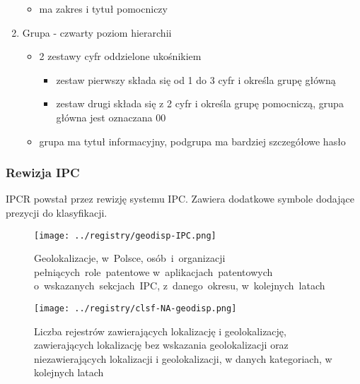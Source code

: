 \begin{enumerate}
\begin{itemize}
        \item ma zakres i tytuł pomocniczy
    \end{itemize}
    \item Grupa - czwarty poziom hierarchii
    \begin{itemize}
        \item 2 zestawy cyfr oddzielone ukośnikiem
        \begin{itemize}
            \item zestaw pierwszy składa się od 1 do 3 cyfr i określa grupę główną
            \item zestaw drugi składa się z 2 cyfr i określa grupę pomocniczą, grupa główna jest oznaczana 00
        \end{itemize}
        \item grupa ma tytuł informacyjny, podgrupa ma bardziej szczegółowe hasło
    \end{itemize}
\end{enumerate}



\subsubsection{Rewizja \ac{IPC}}

\ac{IPCR} powstał przez rewizję systemu \ac{IPC}. Zawiera dodatkowe
symbole dodające prezycji do klasyfikacji.

\begin{figure}[H]\centering
\texttt{[image: ../registry/geodisp-IPC.png]}
\caption{Geolokalizacje,
         w~Polsce,
         osób~i~organizacji 
         pełniących~role~patentowe 
         w~aplikacjach~patentowych
         o~wskazanych~sekcjach~IPC,
         z~danego~okresu,
         w~kolejnych~latach}
\label{fig:geodisp.png}
\end{figure}



\begin{figure}[H]\centering
\texttt{[image: ../registry/clsf-NA-geodisp.png]}
\caption{Liczba rejestrów zawierających lokalizację i geolokalizację,
         zawierających lokalizację bez wskazania geolokalizacji
         oraz niezawierających lokalizacji i geolokalizacji,
         w danych kategoriach, w kolejnych latach}
\label{fig:geodisp.png}
\end{figure}